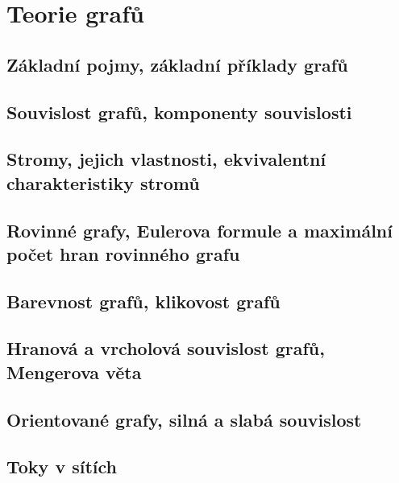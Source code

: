 \documentclass[../../main.tex]{subfiles}
\begin{document}
\section{Teorie grafů}

\subsection{Základní pojmy, základní příklady grafů}
\subsection{Souvislost grafů, komponenty souvislosti}
\subsection{Stromy, jejich vlastnosti, ekvivalentní charakteristiky stromů}
\subsection{Rovinné grafy, Eulerova formule a maximální počet hran rovinného grafu}
\subsection{Barevnost grafů, klikovost grafů}
\subsection{Hranová a vrcholová souvislost grafů, Mengerova věta}
\subsection{Orientované grafy, silná a slabá souvislost}
\subsection{Toky v sítích}
\end{document}
